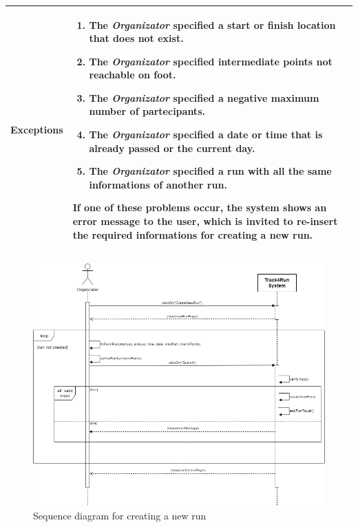 \begin{table}[H]
\begin{tabular}{|p{3.5cm}|p{10.3cm}|}
    \hline
    \textbf{\large{Exceptions}} 		& \begin{enumerate}[leftmargin=0.5cm]
                                          	\item The \emph{Organizator} specified a start or finish location that does not exist.
                                            \item The \emph{Organizator} specified intermediate points not reachable on foot.
                                             \item The \emph{Organizator} specified a negative maximum number of partecipants.
                                            \item The \emph{Organizator} specified a date or time that is already passed or the current day.
                                            \item The \emph{Organizator} specified a run with all the same informations of another run.
                                          \end{enumerate}
    										If one of these problems occur, the system shows an error message to the user, which is invited to re-insert the required informations for creating a new run.\\
    
    \hline
    
    \end{tabular}
	
\end{table}

\begin{figure}[H]
    \centering
    \includegraphics[scale=0.4]{Pictures/createNewRunSeqDiag.png}
    \caption{Sequence diagram for creating a new run}
\end{figure}
